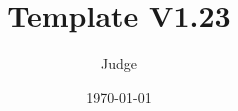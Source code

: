 \documentclass[a4paper]{article}
\begin{document}
\title{\Huge \bf Template V1.23}
\author{Judge}
\date{\today}

\maketitle

\begin{multicols*}{2}
\tableofcontents
\end{multicols*}

\clearpage

\columnseprule=0pt
\fontsize{7pt}{9pt}
\selectfont

\setcounter{page}{1}
\begin{multicols*}{2}

\end{multicols*}
\end{document}
